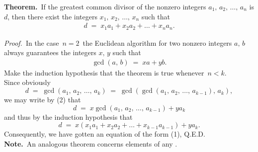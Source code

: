 \documentclass[12pt]{article}
\theoremstyle{definition}
\begin{document}
\textbf{Theorem.}\, If the greatest common divisor of the nonzero integers $a_1,\,a_2,\,\ldots,\,a_n$ is $d$, then there exist the integers $x_1,\,x_2,\,\ldots,\,x_n$ such that
\begin{align}
d \;=\; x_1a_1\!+\!x_2a_2\!+\ldots+\!x_na_n.
\end{align}

\emph{Proof.}\, In the case \,$n = 2$\, the Euclidean algorithm for two nonzero integers $a,\,b$ always guarantees the integers $x,\,y$ such that
\begin{align}
\gcd(a,\,b) \;=\; xa\!+\!yb.
\end{align}
Make the induction hypothesis that the theorem is true whenever\, $n < k$.\\
Since obviously
$$d \;=\; \gcd(a_1,\,a_2,\,\ldots,\,a_k) \;=\; \gcd(\gcd(a_1,\,a_2,\,\ldots,\,a_{k-1}),\,a_k),$$
we may write by (2) that
$$d \;=\; x\gcd(a_1,\,a_2,\,\ldots,\,a_{k-1})+ya_k$$
and thus by the induction hypothesis that
$$d \;=\; x(x_1a_1\!+\!x_2a_2\!+\ldots+\!x_{k-1}a_{k-1})\!+\!ya_k.$$
Consequently, we have gotten an equation of the form (1), Q.E.D.\\


\textbf{Note.}\, An analogous theorem concerns elements of any .
\end{document}
